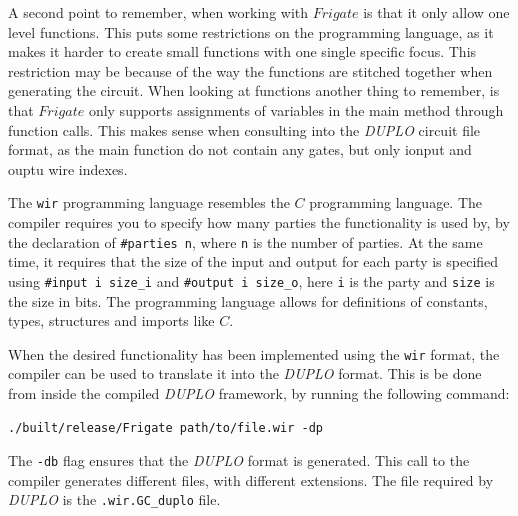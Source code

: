 \documentclass[twoside,11pt,openright]{report}
\newcommand{\DUPLO}{\textit{DUPLO} }
\begin{document}
A second point to remember, when working with $Frigate$ is that it only allow one level functions. This puts some restrictions on the programming language, as it makes it harder to create small functions with one single specific focus. This restriction  may be because of the way the functions are stitched together when generating the circuit. When looking at functions another thing to remember, is that $Frigate$ only supports assignments of variables in the main method through function calls. This makes sense when consulting into the \DUPLO circuit file format, as the main function do not contain any gates, but only ionput and ouptu wire indexes.

The \verb|wir| programming language resembles the $C$ programming language. The compiler requires you to specify how many parties the functionality is used by, by the declaration of \verb|#parties n|, where \verb|n| is the number of parties. At the same time, it requires that the size of the input and output for each party is specified using \verb|#input i size_i| and \verb|#output i size_o|, here \verb|i| is the party and \verb|size| is the size in bits. The programming language allows for definitions of constants, types, structures and imports like $C$.

\bigskip

When the desired functionality has been implemented using the \verb|wir| format, the compiler can be used to translate it into the \DUPLO format. This is be done from inside the compiled \DUPLO framework, by running the following command:

\begin{center}
\begin{verbatim}
./built/release/Frigate path/to/file.wir -dp
\end{verbatim}
\end{center}

The \verb|-db| flag ensures that the \DUPLO format is generated. This call to the compiler generates different files, with different extensions. The file required by \DUPLO is the \verb|.wir.GC_duplo| file.

\bigskip
\end{document}
